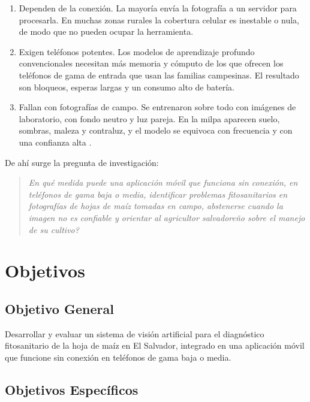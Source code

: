 \begin{enumerate}
\item Dependen de la conexi\'on. La mayor\'ia env\'ia la fotograf\'ia a un servidor para procesarla. En muchas zonas rurales la cobertura celular es inestable o nula, de modo que no pueden ocupar la herramienta.
\item Exigen tel\'efonos potentes. Los modelos de aprendizaje profundo convencionales necesitan m\'as memoria y c\'omputo de los que ofrecen los tel\'efonos de gama de entrada que usan las familias campesinas. El resultado son bloqueos, esperas largas y un consumo alto de bater\'ia.
\item Fallan con fotograf\'ias de campo. Se entrenaron sobre todo con im\'agenes de laboratorio, con fondo neutro y luz pareja. En la milpa aparecen suelo, sombras, maleza y contraluz, y el modelo se equivoca con frecuencia y con una confianza alta \cite{ahmad2023a}.
\end{enumerate}

De ah\'i surge la pregunta de investigaci\'on:
\begin{quote}
\centering
\itshape
\textquestiondown En qu\'e medida puede una aplicaci\'on m\'ovil que funciona sin conexi\'on, en tel\'efonos de gama baja o media, identificar problemas fitosanitarios en fotograf\'ias de hojas de ma\'iz tomadas en campo, abstenerse cuando la imagen no es confiable y orientar al agricultor salvadore\~no sobre el manejo de su cultivo?
\end{quote}

\section{Objetivos}

\subsection{Objetivo General}

Desarrollar y evaluar un sistema de visi\'on artificial para el diagn\'ostico fitosanitario de la hoja de ma\'iz en El Salvador, integrado en una aplicaci\'on m\'ovil que funcione sin conexi\'on en tel\'efonos de gama baja o media.

\subsection{Objetivos Espec\'ificos}

